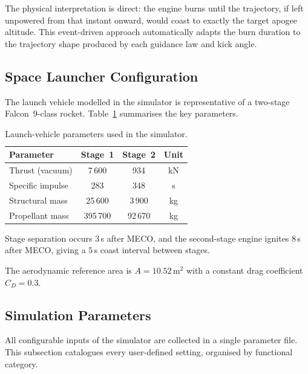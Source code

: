 The physical interpretation is direct: the engine burns until the trajectory,
if left unpowered from that instant onward, would coast to exactly the target
apogee altitude.  This event-driven approach automatically adapts the burn
duration to the trajectory shape produced by each guidance law and kick angle.

\subsection{Space Launcher Configuration}
\label{ssec:launcher}

The launch vehicle modelled in the simulator is representative of a
two-stage Falcon~9-class rocket.  Table~\ref{tab:launcher} summarises
the key parameters.

\begin{table}[htbp]
  \centering
  \caption{Launch-vehicle parameters used in the simulator.}
  \label{tab:launcher}
  \begin{tabular}{l c c c}
    \toprule
    \textbf{Parameter} & \textbf{Stage~1} & \textbf{Stage~2} & \textbf{Unit} \\
    \midrule
    Thrust (vacuum)       & 7\,600  & 934    & kN   \\
    Specific impulse      & 283     & 348    & s    \\
    Structural mass       & 25\,600 & 3\,900 & kg   \\
    Propellant mass       & 395\,700& 92\,670& kg   \\
    \bottomrule
  \end{tabular}
\end{table}

Stage separation occurs $3$\,s after MECO, and the second-stage engine ignites
$8$\,s after MECO, giving a $5$\,s coast interval between stages.

The aerodynamic reference area is $A = 10.52$\,m$^2$ with a constant drag
coefficient $C_D = 0.3$.

\subsection{Simulation Parameters}
\label{ssec:sim_parameters}

All configurable inputs of the simulator are collected in a single parameter
file.  This subsection catalogues every user-defined setting, organised by
functional category.

